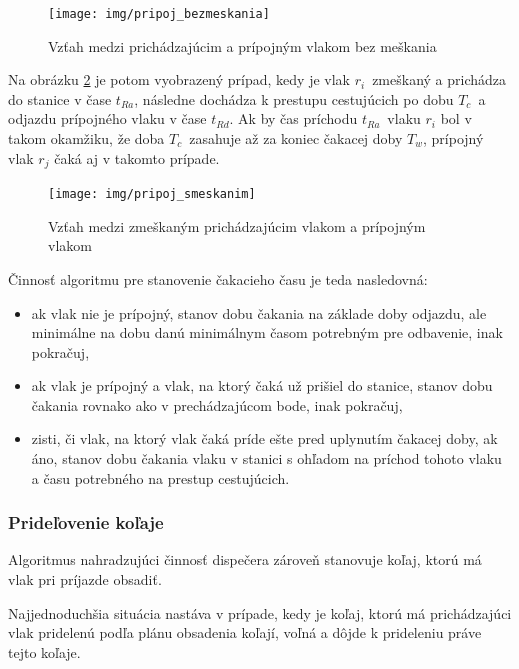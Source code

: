 \documentclass[12pt,a4paper,titlepage,final]{article}
\begin{document}
\begin{figure}[!h]
	\vspace{2em}
	\centering
	\texttt{[image: img/pripoj\_bezmeskania]}
	\caption{Vzťah medzi prichádzajúcim a prípojným vlakom bez meškania} \label{fig:prip_bez}
\end{figure}

Na obrázku \ref{fig:prip_s} je potom vyobrazený prípad, kedy je vlak $r_i$ zmeškaný a prichádza do stanice
v čase $t_{Ra}$, následne dochádza k prestupu cestujúcich po dobu $T_c$ a odjazdu prípojného vlaku
v čase $t_{Rd}$. Ak by čas príchodu $t_{Ra}$ vlaku $r_i$ bol v takom okamžiku, že doba $T_c$ zasahuje až za koniec čakacej doby $T_w$, prípojný vlak $r_j$ čaká aj v takomto prípade.

\begin{figure}[!h]
	\vspace{2em}
	\centering
	\texttt{[image: img/pripoj\_smeskanim]}
	\caption{Vzťah medzi zmeškaným prichádzajúcim vlakom a prípojným vlakom} \label{fig:prip_s}
\end{figure}

\vspace{1em}
{\setlength{\parindent}{0cm}
Činnosť algoritmu pre stanovenie čakacieho času je teda nasledovná:
\begin{itemize}
	\item ak vlak nie je prípojný, stanov dobu čakania na základe doby odjazdu, ale minimálne na dobu
	danú minimálnym časom potrebným pre odbavenie, inak pokračuj,
	\item ak vlak je prípojný a vlak, na ktorý čaká už prišiel do stanice, stanov dobu čakania rovnako ako v prechádzajúcom bode, inak pokračuj,
	\item zisti, či vlak, na ktorý vlak čaká príde ešte pred uplynutím čakacej doby, ak áno, stanov dobu čakania vlaku v stanici s ohľadom na príchod tohoto vlaku a času potrebného na prestup cestujúcich.
\end{itemize}
}

\subsubsection*{Prideľovenie koľaje} \label{sec:pridelovanie}

Algoritmus nahradzujúci činnosť dispečera zároveň stanovuje koľaj, ktorú má vlak pri príjazde obsadiť.

Najjednoduchšia situácia nastáva v prípade, kedy je koľaj, ktorú má prichádzajúci vlak pridelenú
podľa plánu obsadenia koľají, voľná a dôjde k prideleniu práve tejto koľaje.
\end{document}
